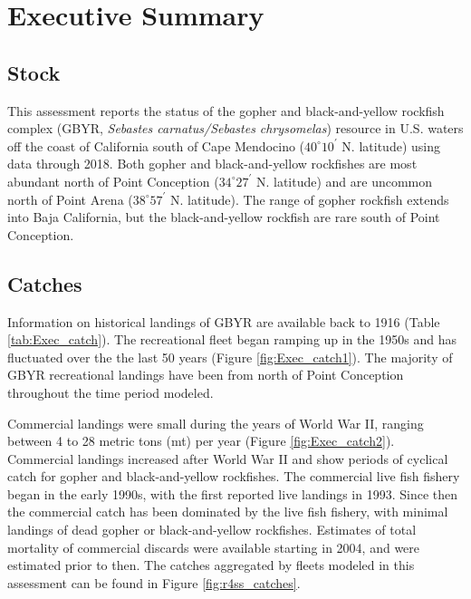 \documentclass[12pt,]{article}
\begin{document}
{
\setcounter{tocdepth}{4}
\tableofcontents
}
\setlength{\parskip}{5mm plus1mm minus1mm} \pagebreak

\setcounter{page}{1} \renewcommand{\thefigure}{\alph{figure}}
\renewcommand{\thetable}{\alph{table}}

\section*{Executive Summary}\label{executive-summary}

\subsection*{Stock}\label{stock}

This assessment reports the status of the gopher and black-and-yellow
rockfish\\
complex (GBYR, \emph{Sebastes carnatus/Sebastes chrysomelas}) resource
in U.S. waters off the coast of California south of Cape Mendocino
(\(40^\circ 10^\prime\) N. latitude) using data through 2018. Both
gopher and black-and-yellow rockfishes are most abundant north of Point
Conception (\(34^\circ 27^\prime\) N. latitude) and are uncommon north
of Point Arena (\(38^\circ 57^\prime\) N. latitude). The range of gopher
rockfish extends into Baja California, but the black-and-yellow rockfish
are rare south of Point Conception.

\subsection*{Catches}\label{catches}

Information on historical landings of GBYR are available back to 1916
(Table \ref{tab:Exec_catch}). The recreational fleet began ramping up in
the 1950s and has fluctuated over the the last 50 years (Figure
\ref{fig:Exec_catch1}). The majority of GBYR recreational landings have
been from north of Point Conception throughout the time period modeled.

Commercial landings were small during the years of World War II, ranging
between 4 to 28 metric tons (mt) per year (Figure
\ref{fig:Exec_catch2}). Commercial landings increased after World War II
and show periods of cyclical catch for gopher and black-and-yellow
rockfishes. The commercial live fish fishery began in the early 1990s,
with the first reported live landings in 1993. Since then the commercial
catch has been dominated by the live fish fishery, with minimal landings
of dead gopher or black-and-yellow rockfishes. Estimates of total
mortality of commercial discards were available starting in 2004, and
were estimated prior to then. The catches aggregated by fleets modeled
in this assessment can be found in Figure \ref{fig:r4ss_catches}.
\end{document}
